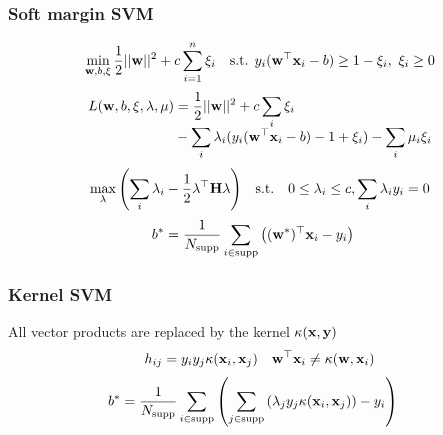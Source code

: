 \begin{mdframed}[style=eqbox]
\subsubsection{Soft margin SVM}
\vspace*{-10pt}\begin{align*}
  \min_{\mathbf{w}, b, \mathbf{\xi}} \frac{1}{2} \vert\vert \mathbf{w} \vert\vert^2 + c \sum_{i=1}^{n} \xi_i && \text{s.t. } y_i (\mathbf{w}^\top \mathbf{x}_i - b) \geq 1 - \xi_i,~ \xi_i \geq 0
\end{align*}
\vspace*{-10pt}\begin{align*}
L(\mathbf{w}, b, \mathbf{\xi}, \mathbf{\lambda}, \mathbf{\mu}) &= \frac{1}{2} \vert\vert \mathbf{w} \vert\vert^2 + c \sum_i \xi_i \\[ - 0.5em]
&- \sum_i \lambda_i (y_i (\mathbf{w}^\top \mathbf{x}_i - b) - 1 + \xi_i) - \sum_i \mu_i \xi_i
\end{align*}\vspace*{-10pt}\begin{align*}
  \max_{\mathbf{\lambda}} \left(\sum_i \lambda_i - \frac{1}{2} \mathbf{\lambda}^\top \mathbf{H} \mathbf{\lambda}\right) && \text{s.t.} \quad 0 \leq \mathbf{\lambda}_i \leq c, \sum_i \lambda_i y_i = 0
\end{align*}\vspace*{-6pt}
\begin{align*}
b^* &= \frac{1}{N_{\mathrm{supp}}} \sum_{i \in \mathrm{supp}} \left( (\mathbf{w}^*)^\top \mathbf{x}_i - y_i \right)
\end{align*}
\subsubsection{Kernel SVM}
All vector products are replaced by the kernel $\kappa(\mathbf{x},\mathbf{y})$
\vspace*{-4pt}\begin{align*}
  h_{ij} = y_iy_j \kappa(\mathbf{x}_i, \mathbf{x}_j) && \mathbf{w}^\top \mathbf{x}_i \neq \kappa(\mathbf{w}, \mathbf{x}_i)
\end{align*}\vspace*{-14pt}
\begin{align*}
b^* &= \frac{1}{N_{\mathrm{supp}}} \sum_{i \in \mathrm{supp}} \left( \sum_{j \in \mathrm{supp}} \left(\lambda_j y_j \kappa(\mathbf{x}_i, \mathbf{x}_j)\right) - y_i \right)
\end{align*}
\end{mdframed}